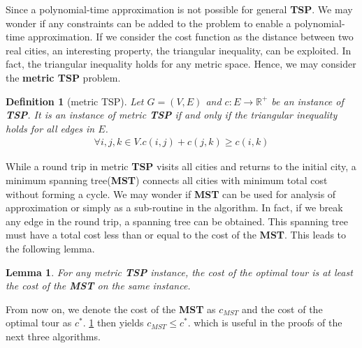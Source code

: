 \documentclass[11pt,psfig,times]{article}
\newtheorem{lemma}[theorem]{Lemma}
\newtheorem{definition}[theorem]{Definition}
\begin{document}
Since a polynomial-time approximation is not possible for general \textbf{TSP}. We may wonder if any constraints 
can be added to the problem to enable a polynomial-time approximation. If we consider the cost function as the distance between 
two real cities, an interesting property, the triangular inequality, can be exploited. 
In fact, the triangular inequality holds for any metric space. Hence, we may consider the \textbf{metric TSP} problem.
\begin{definition}[metric TSP]
    Let $G = (V, E)$ and $c: E \rightarrow \mathbb{R}^+$ be an instance of \textbf{TSP}. It is an instance of metric \textbf{TSP} 
    if and only if the triangular inequality holds for all edges in $E$.
    \begin{align*}
        \forall i, j, k \in V. c(i, j) + c(j, k) \geq c(i, k)
    \end{align*}
\end{definition} 
While a round trip in metric \textbf{TSP} visits all cities and returns to the initial city, a minimum spanning tree(\textbf{MST})
connects all cities with minimum total cost without forming a cycle. We may wonder if \textbf{MST} can be used for analysis of 
approximation or simply as a sub-routine in the algorithm. In fact, if we break any edge in the round trip, a spanning tree 
can be obtained. This spanning tree must have a total cost less than or equal to the cost of the \textbf{MST}. This 
leads to the following lemma. 
\begin{lemma}
    \label{lemma:MST}
    For any metric \textbf{TSP} instance, the cost of the optimal tour is at least the cost of the \textbf{MST} on the same 
    instance.
\end{lemma}
From now on, we denote the cost of the \textbf{MST} as $c_{MST}$ and the cost of the optimal tour as $c^*$. \cref{lemma:MST} then 
yields $c_{MST} \leq c^*$. which is useful in the proofs of the next three algorithms. 
\end{document}
